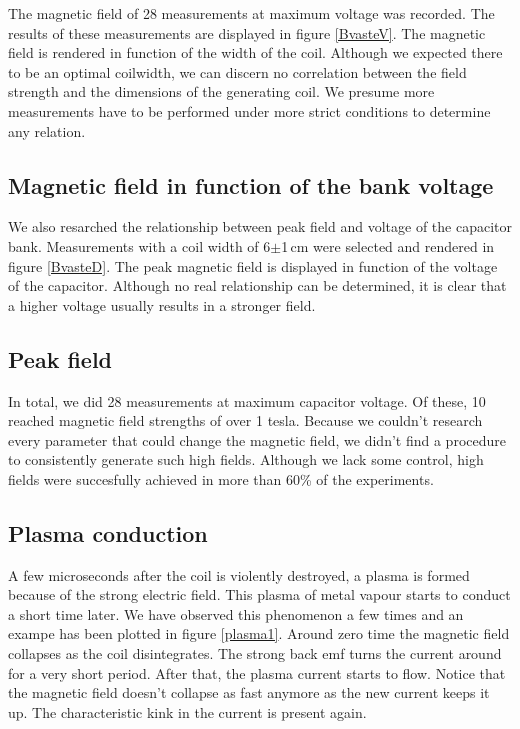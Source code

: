 The magnetic field of 28 measurements at maximum voltage was recorded. The 
results of these measurements are displayed in figure \ref{BvasteV}. The 
magnetic field is rendered in function of the width of the coil. Although 
we expected there to be an optimal coilwidth, we can discern no correlation 
between the field strength and the dimensions of the generating coil. We 
presume more measurements have to be performed under more strict conditions 
to determine any relation.


\subsection{Magnetic field in function of the bank voltage}

We also resarched the relationship between peak field and voltage of the 
capacitor bank. Measurements with a coil width of 6$\pm$1\,cm were selected and 
rendered in figure \ref{BvasteD}. The peak magnetic field is displayed in 
function of the voltage of the capacitor. Although no real relationship can be 
determined, it is clear that a higher voltage usually results in a stronger 
field.


\subsection{Peak field}

In total, we did 28 measurements at maximum capacitor voltage. Of these, 10 
reached magnetic field strengths of over 1 tesla. Because we couldn't research 
every parameter that could change the magnetic field, we didn't find a 
procedure to consistently generate such high fields. Although we lack some 
control, high fields were succesfully achieved in more than 60\% of the 
experiments.

\subsection{Plasma conduction}

A few microseconds after the coil is violently destroyed, a plasma is formed 
because of the strong electric field. This plasma of metal vapour starts to 
conduct a short time later. We have observed this phenomenon a few times and an 
exampe has been plotted in figure \ref{plasma1}. Around zero time the magnetic 
field collapses as the coil disintegrates. The strong back emf turns the 
current around for a very short period. After that, the plasma current starts 
to flow. Notice that the magnetic field doesn't collapse as fast anymore as the 
new current keeps it up. The characteristic kink in the current is present 
again.

